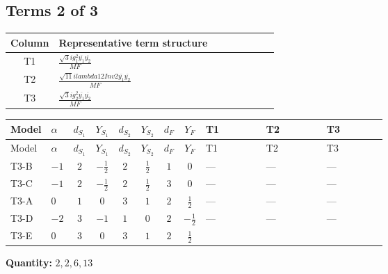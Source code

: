 \documentclass[8pt]{article}
\begin{document}
\begin{landscape}
\subsection*{Terms 2 of 3}
\begin{center}
\begin{tabular}{@{}c >{\raggedright\arraybackslash}p{0.82\linewidth}@{}}
\toprule
Column & Representative term structure \\
\midrule
T1 & \(\displaystyle \frac{\sqrt{3} i g_{1}^{2} \overline{y_{1}} \overline{y_{2}}}{MF}\) \\
\midrule
T2 & \(\displaystyle \frac{\sqrt{11} i lambda12Inv2 \overline{y_{1}} \overline{y_{2}}}{MF}\) \\
\midrule
T3 & \(\displaystyle \frac{\sqrt{3} i g_{2}^{2} \overline{y_{1}} \overline{y_{2}}}{MF}\) \\
\midrule
\bottomrule
\end{tabular}
\end{center}
\smallskip
\tiny
\begin{longtable}{@{}llcccccc >{\raggedright\arraybackslash}p{0.21\linewidth} >{\raggedright\arraybackslash}p{0.21\linewidth} >{\raggedright\arraybackslash}p{0.21\linewidth}@{}}
\toprule
Model & $\alpha$ & $d_{S_1}$ & $Y_{S_1}$ & $d_{S_2}$ & $Y_{S_2}$ & $d_F$ & $Y_F$ & T1 & T2 & T3 \\
\midrule
\endfirsthead
\toprule
Model & $\alpha$ & $d_{S_1}$ & $Y_{S_1}$ & $d_{S_2}$ & $Y_{S_2}$ & $d_F$ & $Y_F$ & T1 & T2 & T3 \\
\midrule
\endhead
T3-B & $-1$ & $2$ & $-\frac{1}{2}$ & $2$ & $\frac{1}{2}$ & $1$ & $0$ & --- & --- & --- \\
\midrule
T3-C & $-1$ & $2$ & $-\frac{1}{2}$ & $2$ & $\frac{1}{2}$ & $3$ & $0$ & --- & --- & --- \\
\midrule
T3-A & $0$ & $1$ & $0$ & $3$ & $1$ & $2$ & $\frac{1}{2}$ & --- & --- & --- \\
\midrule
T3-D & $-2$ & $3$ & $-1$ & $1$ & $0$ & $2$ & $-\frac{1}{2}$ & --- & --- & --- \\
\midrule
T3-E & $0$ & $3$ & $0$ & $3$ & $1$ & $2$ & $\frac{1}{2}$ & \scriptsize\adjustbox{max width=\linewidth}{$\begin{gathered} \frac{\sqrt{3} i g_{1}^{2} \overline{y_{1}} \overline{y_{2}}}{8 MF}\end{gathered}$} & \scriptsize\adjustbox{max width=\linewidth}{$\begin{gathered} \frac{3 \sqrt{11} i lambda12Inv2 \overline{y_{1}} \overline{y_{2}}}{22 MF}\end{gathered}$} & \scriptsize\adjustbox{max width=\linewidth}{$\begin{gathered} \frac{49 \sqrt{3} i g_{2}^{2} \overline{y_{1}} \overline{y_{2}}}{24 MF}\end{gathered}$} \\
\midrule
\bottomrule
\end{longtable}
\clearpage
\noindent\textbf{Quantity: }$\mathrm{2,2,6,13}$\par\smallskip

\end{landscape}
\end{document}
